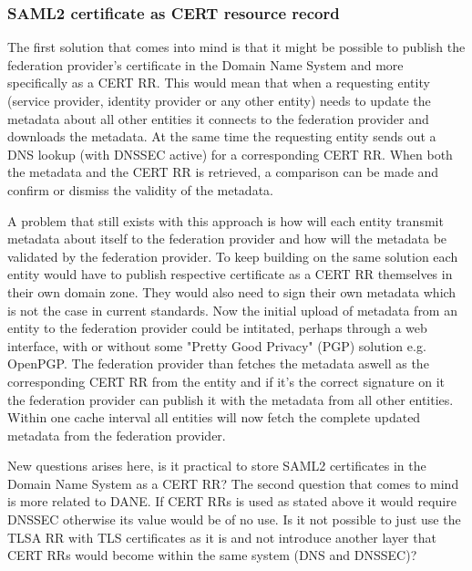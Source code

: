 \subsubsection{SAML2 certificate as CERT resource record}
\label{subsec:saml2-certificate-as-tlsa}
The first solution that comes into mind is that it might be possible to publish the federation provider's certificate in the Domain Name System and more specifically as a CERT RR\cite{rfc:4398}.
This would mean that when a requesting entity (service provider, identity provider or any other entity) needs to update the metadata about all other entities it connects to the federation provider and downloads the metadata.
At the same time the requesting entity sends out a DNS lookup (with DNSSEC active) for a corresponding CERT RR.
When both the metadata and the CERT RR is retrieved, a comparison can be made and confirm or dismiss the validity of the metadata.

A problem that still exists with this approach is how will each entity transmit metadata about itself to the federation provider and how will the metadata be validated by the federation provider.
To keep building on the same solution each entity would have to publish respective certificate as a CERT RR themselves in their own domain zone.
They would also need to sign their own metadata which is not the case in current standards. 
Now the initial upload of metadata from an entity to the federation provider could be intitated, perhaps through a web interface, with or without some "Pretty Good Privacy" (PGP) solution e.g. OpenPGP\cite{rfc:2440}.
The federation provider than fetches the metadata aswell as the corresponding CERT RR from the entity and if it's the correct signature on it the federation provider can publish it with the metadata from all other entities.
Within one cache interval all entities will now fetch the complete updated metadata from the federation provider.


New questions arises here, is it practical to store SAML2 certificates in the Domain Name System as a CERT RR?
The second question that comes to mind is more related to DANE.
If CERT RRs is used as stated above it would require DNSSEC otherwise its value would be of no use.
Is it not possible to just use the TLSA RR with TLS certificates as it is and not introduce another layer that CERT RRs would become within the same system (DNS and DNSSEC)?

